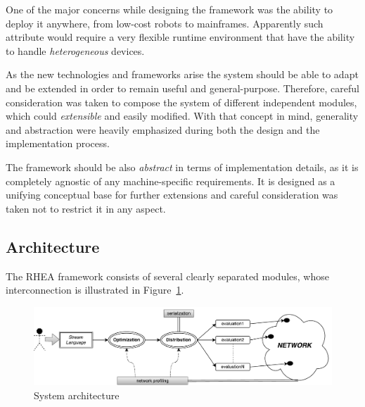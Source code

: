 \documentclass[sigplan,screen,10pt]{acmart}
\begin{document}
One of the major concerns while designing the framework was the ability to
deploy it anywhere, from low-cost robots to mainframes. Apparently such
attribute would require a very flexible runtime environment that have the ability to handle
\textit{heterogeneous} devices.

As the new technologies and frameworks arise the system should be able to adapt
and be extended in order to remain useful and general-purpose.
Therefore, careful consideration was taken to compose the system of different
independent modules, which could \textit{extensible} and easily modified. With that concept
in mind, generality and abstraction were heavily emphasized during both the design
and the implementation process.

The framework should be also \textit{abstract} in terms of implementation details,
as it is completely agnostic of any machine-specific requirements. It is designed as a
unifying conceptual base for further extensions and careful consideration was
taken not to restrict it in any aspect.

\subsection{Architecture}
The \textsc{RHEA} framework consists of several clearly separated modules,
whose interconnection is illustrated in Figure~\ref{fig:architecture}.
%
\begin{figure}
  \centering
  \includegraphics[scale=0.6]{architecture}
    \caption{System architecture}
    \label{fig:architecture}
\end{figure}
\end{document}
